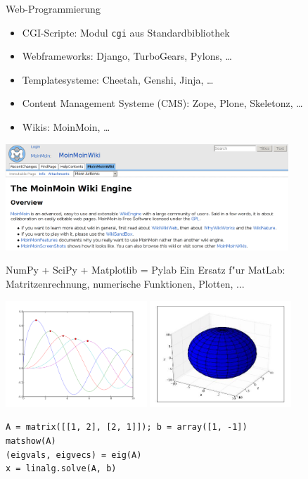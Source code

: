 \begin{frame}{Web-Programmierung}
\begin{itemize}
\item CGI-Scripte: Modul \texttt{cgi} aus  Standardbibliothek
\item Webframeworks: Django, TurboGears, Pylons, \dots
\item Templatesysteme: Cheetah, Genshi, Jinja, \dots
\item Content Management Systeme (CMS): Zope, Plone, Skeletonz, \dots
\item Wikis: MoinMoin, \dots
\end{itemize}

\includegraphics[height=4cm]{images/moinmoin.png}
\end{frame}

\begin{frame}[fragile]{NumPy + SciPy + Matplotlib = Pylab}
Ein Ersatz f"ur MatLab: Matritzenrechnung, numerische Funktionen, Plotten, ...

\includegraphics[height=4cm]{images/matplotlib.png}
\includegraphics[height=4cm]{images/surface.jpg}

\begin{lstlisting}[style=Python, basicstyle=\small]
A = matrix([[1, 2], [2, 1]]); b = array([1, -1])
matshow(A)
(eigvals, eigvecs) = eig(A)
x = linalg.solve(A, b)
\end{lstlisting}
\end{frame}

